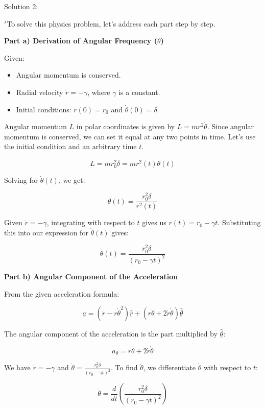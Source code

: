 Solution 2:

"To solve this physics problem, let's address each part step by step.

\textbf{Part a) Derivation of Angular Frequency (\( \dot{\theta} \))}

Given:
\begin{itemize}
    \item Angular momentum is conserved.
    \item Radial velocity \( \dot{r} = - \gamma \), where \( \gamma \) is a constant.
    \item Initial conditions: \( r(0) = r_{0} \) and \( \dot{\theta}(0) = \delta \).
\end{itemize}

Angular momentum \( L \) in polar coordinates is given by \( L = m r^{2} \dot{\theta} \). Since angular momentum is conserved, we can set it equal at any two points in time. Let's use the initial condition and an arbitrary time \( t \).

\[ L = m r_{0}^{2} \delta = m r^{2}(t) \dot{\theta}(t) \]

Solving for \( \dot{\theta}(t) \), we get:

\[ \dot{\theta}(t) = \frac{r_{0}^{2} \delta}{r^{2}(t)} \]

Given \( \dot{r} = -\gamma \), integrating with respect to \( t \) gives us \( r(t) = r_{0} - \gamma t \). Substituting this into our expression for \( \dot{\theta}(t) \) gives:

\[ \dot{\theta}(t) = \frac{r_{0}^{2} \delta}{(r_{0} - \gamma t)^{2}} \]

\textbf{Part b) Angular Component of the Acceleration}

From the given acceleration formula:

\[ \underline{a} = (\ddot{r} - r \dot{\theta}^{2}) \underline{\hat{r}} + (r \ddot{\theta} + 2\dot{r}\dot{\theta} ) \underline{\hat{\theta}} \]

The angular component of the acceleration is the part multiplied by \( \underline{\hat{\theta}} \):

\[ a_{\theta} = r \ddot{\theta} + 2\dot{r}\dot{\theta} \]

We have \( \dot{r} = -\gamma \) and \( \dot{\theta} = \frac{r_{0}^{2} \delta}{(r_{0} - \gamma t)^{2}} \). To find \( \ddot{\theta} \), we differentiate \( \dot{\theta} \) with respect to \( t \):

\[ \ddot{\theta} = \frac{d}{dt} \left( \frac{r_{0}^{2} \delta}{(r_{0} - \gamma t)^{2}} \right) \]

